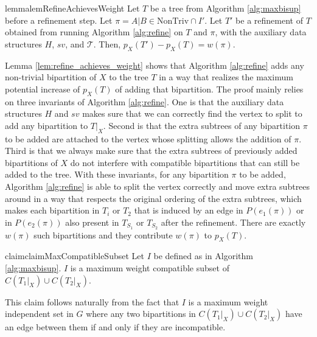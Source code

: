 \documentclass{bmcart}
\newcommand{\ntriv}{\mathrm{NonTriv}}
\theoremstyle{mystyle}
\theoremstyle{proofstyle}
\begin{document}
 
\begin{restatable}{lemma}{lemRefineAchievesWeight} \label{lem:refine_achieves_weight}
Let $T$ be a tree from Algorithm \ref{alg:maxbisup} before a refinement step. Let $\pi = A|B \in \ntriv \cap I'$. Let $T'$ be a refinement of $T$ obtained from running Algorithm \ref{alg:refine} on $T$ and $\pi$, with the auxiliary data structures $H$, $sv$, and $\mathcal{T}$. Then, $p_X(T') - p_X(T) = w(\pi)$. 
\end{restatable}
Lemma \ref{lem:refine_achieves_weight} shows that Algorithm \ref{alg:refine} adds any non-trivial bipartition of $X$ to the tree $T$ in a way that realizes the maximum potential increase of $p_X(T)$ of adding that bipartition. The proof mainly relies on three invariants of Algorithm \ref{alg:refine}. One is that the auxiliary data structures $H$ and $sv$ makes sure that we can correctly find the vertex to split to add any bipartition to $T|_X$. Second is that the extra subtrees of any bipartition $\pi$ to be added are attached to the vertex whose splitting allows the addition of $\pi$. Third is that we always make sure that the extra subtrees of previously added bipartitions of $X$ do not interfere with compatible bipartitions that can still be added to the tree. With these invariants, for any bipartition $\pi$ to be added, Algorithm \ref{alg:refine} is able to split the vertex correctly and move extra subtrees around in a way that respects the original ordering of the extra subtrees, which makes each bipartition in $T_i$ or $T_2$ that is induced by an edge in $P(e_1(\pi))$ or in $P(e_2(\pi))$ also present in $T_{S_1}$ or $T_{S_2}$ after the refinement. There are exactly $w(\pi)$ such bipartitions and they contribute $w(\pi)$ to $p_X(T)$. \smallskip


\begin{restatable}{claim}{claimMaxCompatibleSubset} \label{claim:max_compatible_subset}
    Let $I$ be defined as in Algorithm \ref{alg:maxbisup}. $I$ is a maximum weight compatible subset of $C(T_1|_X) \cup C(T_2|_X)$. 
\end{restatable}
This claim follows naturally from the fact that $I$ is a maximum weight independent set in $G$ where any two bipartitions in $C(T_1|_X) \cup C(T_2|_X)$ have an edge between them if and only if they are incompatible.\smallskip
\end{document}

